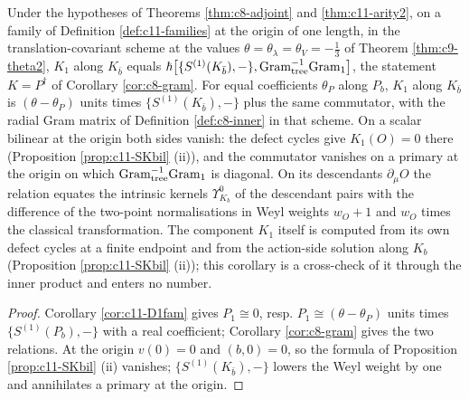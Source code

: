\begin{corollary}
\label{cor:c11-K}
Under the hypotheses of Theorems \ref{thm:c8-adjoint} and \ref{thm:c11-arity2}, on a family of Definition \ref{def:c11-families} at the origin of one length, in the translation-covariant scheme at the values $\theta=\theta_\lambda=\theta_V=-\tfrac13$ of Theorem \ref{thm:c9-theta2}, $K_1$ along $K_{\bar b}$ equals $\hbar\big[\{S^{(1)}(K_{\bar b}),-\},\mathrm{Gram}_{\rm tree}^{-1}\mathrm{Gram}_{\rm 1}\big]$, the statement $K=P^\dagger$ of Corollary \ref{cor:c8-gram}. For equal coefficients $\theta_P$ along $P_b$, $K_1$ along $K_{\bar b}$ is $(\theta-\theta_P)$ units times $\{S^{(1)}(K_{\bar b}),-\}$ plus the same commutator, with the radial Gram matrix of Definition \ref{def:c8-inner} in that scheme. On a scalar bilinear at the origin both sides vanish: the defect cycles give $K_1(O)=0$ there (Proposition \ref{prop:c11-SKbil} (ii)), and the commutator vanishes on a primary at the origin on which $\mathrm{Gram}_{\rm tree}^{-1}\mathrm{Gram}_{\rm 1}$ is diagonal. On its descendants $\partial_\mu O$ the relation equates the intrinsic kernels $\Upsilon^0_{K_b}$ of the descendant pairs with the difference of the two-point normalisations in Weyl weights $w_O+1$ and $w_O$ times the classical transformation. The component $K_1$ itself is computed from its own defect cycles at a finite endpoint and from the action-side solution along $K_b$ (Proposition \ref{prop:c11-SKbil} (ii)); this corollary is a cross-check of it through the inner product and enters no number.
\end{corollary}

\begin{proof}
Corollary \ref{cor:c11-D1fam} gives $P_1\cong0$, resp. $P_1\cong(\theta-\theta_P)$ units times $\{S^{(1)}(P_b),-\}$ with a real coefficient; Corollary \ref{cor:c8-gram} gives the two relations. At the origin $v(0)=0$ and $(b,0)=0$, so the formula of Proposition \ref{prop:c11-SKbil} (ii) vanishes; $\{S^{(1)}(K_{\bar b}),-\}$ lowers the Weyl weight by one and annihilates a primary at the origin.
\end{proof}

